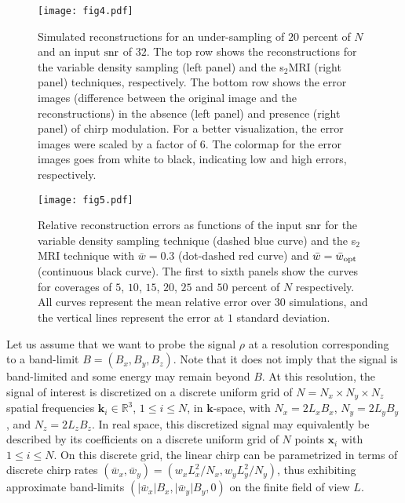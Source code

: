 \documentclass[10pt,draftcls, onecolumn]{IEEEtran}
\begin{document}
\begin{figure}
\centering
\texttt{[image: fig4.pdf]}
\caption{\label{fig:simulated reconstruction 2D} Simulated reconstructions for an under-sampling of $20$ percent of $N$ and an input $\rm snr$ of $32$. The top row shows the reconstructions for the variable density sampling (left panel) and the s$_2$MRI (right panel) techniques, respectively. The bottom row shows the error images (difference between the original image and the reconstructions) in the absence (left panel) and presence (right panel) of chirp modulation. For a better visualization, the error images were scaled by a factor of $6$. The colormap for the error images goes from white to black, indicating low and high errors, respectively.}
\end{figure}


\begin{figure*}
\centering
\texttt{[image: fig5.pdf]}
\caption{\label{fig:curves error 2D} Relative reconstruction errors as functions of the input ${\rm snr}$ for the variable density sampling technique (dashed blue curve) and the s$_2$MRI technique with $\bar{w}=0.3$ (dot-dashed red curve) and $\bar{w} = \bar{w}_{\rm opt}$ (continuous black curve). The first to sixth panels show the curves for coverages of $5$, $10$, $15$, $20$, $25$ and $50$ percent of $N$ respectively. All curves represent the mean relative error over $30$ simulations, and the vertical lines represent the error at $1$ standard deviation.}
\vspace{-3mm}
\end{figure*}


Let us assume that we want to probe the signal $\rho$ at a resolution corresponding to a band-limit $B = (B_x, B_y, B_z)$. Note that it does not imply that the signal is band-limited and some energy may remain beyond $B$. At this resolution, the signal of interest is discretized on a discrete uniform grid of $N=N_x\times N_y\times N_z$ spatial frequencies $\bm{k}_{i}\in\mathbb{R}^{3}$, $1\leq i\leq N$, in $\bm{k}$-space, with $N_x=2L_xB_x$, $N_y=2L_yB_y$, and $N_z = 2L_zB_z$. In real space, this discretized signal may equivalently be described by its coefficients on a discrete uniform grid of $N$ points $\bm{x}_{i}$ with $1\leq i\leq N$. On this discrete grid, the linear chirp can be parametrized in terms of discrete chirp rates $(\bar{w}_x, \bar{w}_y)=\left(w_xL_x^2/N_x, w_yL_y^2/N_y\right)$, thus exhibiting approximate band-limits $(\vert \bar{w}_x \vert B_x, \vert \bar{w}_y \vert B_y, 0)$ on the finite field of view $L$.
\end{document}
